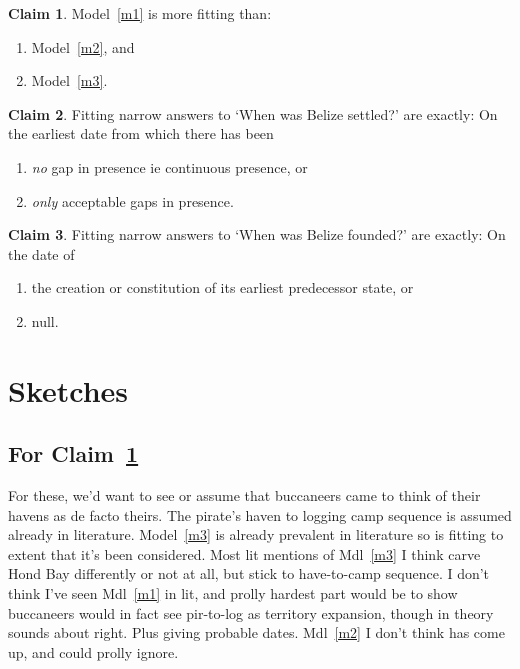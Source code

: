 \documentclass{amsart}
\theoremstyle{definition}%
\theoremstyle{definition}%
\newtheorem{claim}{Claim}
\theoremstyle{remark}%
\theoremstyle{definition}%
\theoremstyle{definition}%
\begin{document}
%
%
\begin{claim}
\label{c1}
Model~\ref{m1} is more fitting than: 
\begin{enumerate}
\item Model~\ref{m2}, and 
\item Model~\ref{m3}.
\end{enumerate}
\end{claim}
%
%
\begin{claim}
\label{c2}
Fitting narrow answers to `When was Belize settled?' are exactly: On the earliest date from which there has been%
\begin{enumerate}
\item \emph{no} gap in presence ie continuous presence, or%
\item \emph{only} acceptable gaps in presence.%
\end{enumerate}
\end{claim}
%
%
\begin{claim}
\label{c3}
Fitting narrow answers to `When was Belize founded?' are exactly: On the date of
\begin{enumerate}
\item the creation or constitution of its earliest predecessor state, or%
\item null.
\end{enumerate}
\end{claim}
%
%
%
%
\section{Sketches}
\label{s:sketches}
%
%
%
%
\subsection{For Claim~\ref{c1}}
For these, we'd want to see or assume that buccaneers came to think of their havens as de facto theirs. The pirate's haven to logging camp sequence is assumed already in literature. Model~\ref{m3} is already prevalent in literature so is fitting to extent that it's been considered. Most lit mentions of Mdl~\ref{m3} I think carve Hond Bay differently or not at all, but stick to have-to-camp sequence. I don't think I've seen Mdl~\ref{m1} in lit, and prolly hardest part would be to show buccaneers would in fact see pir-to-log as territory expansion, though in theory sounds about right. Plus giving probable dates. Mdl~\ref{m2} I don't think has come up, and could prolly ignore.
\end{document}
